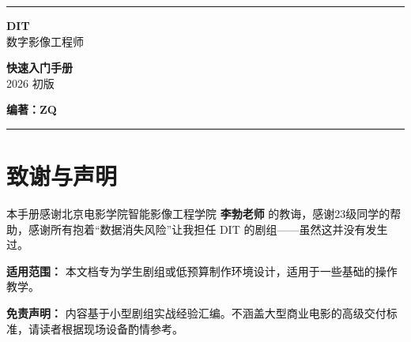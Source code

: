 \documentclass[10pt, a5paper]{article}
\newcommand{\libo}{\textbf{\textcolor{DITBlue}{李勃老师}}}
\begin{document}
\begin{titlepage}
    \pagecolor{DITBlue} 
    \color{white}
    
    \vspace*{1cm}
    \noindent\rule{2cm}{2pt} 
    
    \vspace{1.5cm}
    
    \begin{flushleft}
        {\fontsize{40}{48}\selectfont \textbf{DIT}}\\[0.5cm]
        {\fontsize{18}{24}\selectfont 数字影像工程师}
        
        \vspace{3cm}
        
        {\fontsize{24}{30}\selectfont \textbf{快速入门手册}} \\
        \vspace{0.2cm}
        {\small 2026 初版}
    \end{flushleft}
    
    \vfill
    
    \begin{flushright}
        \small 
        \textbf{编著：ZQ} \\
    \end{flushright}
    
    \vspace{1cm}
    \noindent\rule{\linewidth}{0.5pt} 
\end{titlepage}

\pagecolor{white}
\color{black}

\newpage
\thispagestyle{empty} 

\section*{致谢与声明}

本手册感谢北京电影学院智能影像工程学院 \libo{} 的教诲，感谢23级同学的帮助，感谢所有抱着“数据消失风险”让我担任 DIT 的剧组——虽然这并没有发生过。

\vspace{0.5cm}

\begin{tcolorbox}[
    colback=LightBlue, 
    colframe=white, 
    arc=0mm, 
    left=1mm, right=1mm, top=1mm, bottom=1mm
]
    \small 
    \textbf{适用范围：} 本文档专为学生剧组或低预算制作环境设计，适用于一些基础的操作教学。
    
    \vspace{0.2cm}
    
    \textbf{免责声明：} 内容基于小型剧组实战经验汇编。不涵盖大型商业电影的高级交付标准，请读者根据现场设备酌情参考。
\end{tcolorbox}
\end{document}
